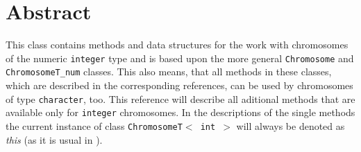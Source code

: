 \section{Abstract}

This class contains methods and data structures for the work
with chromosomes of the numeric {\tt integer} type and
is based upon the more general {\tt Chromosome} and {\tt ChromosomeT\_num}
classes.
This also means, that all methods in these classes, which are
described in the corresponding references, can be used by
chromosomes of type {\tt character}, too.
This reference will describe all aditional methods that
are available only for {\tt integer} chromosomes.
In the descriptions of the single methods the current instance
of class {\tt ChromosomeT$<$ int $>$} will always be denoted
as {\em this} (as it is usual in \cpp).
